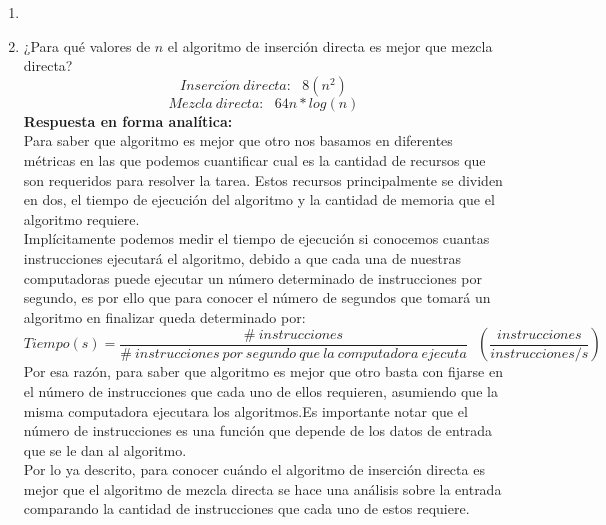 \documentclass[11pt]{article}
\begin{document}
\begin{enumerate}
 \item 
 
 
 
 
 
 
 
 
 \item ¿Para qué valores de $n$ el algoritmo de inserción directa es mejor 
 que mezcla directa? 
 \[
  Inserci\acute{o}n \ directa : \ \ \ 8(n^2)\]
  \[
  Mezcla\ directa: \ \ \ 64n*log(n)
 \]
 \textbf{Respuesta en forma analítica:} \\ 
  Para saber que algoritmo es mejor que otro nos basamos en diferentes 
  métricas en las que podemos cuantificar cual es la cantidad
  de recursos que son requeridos para resolver la tarea. Estos 
  recursos principalmente se dividen en dos, el tiempo de ejecución del
  algoritmo y la cantidad de memoria que el algoritmo requiere.\\
  Implícitamente podemos medir el tiempo de ejecución si conocemos 
  cuantas instrucciones ejecutará el algoritmo, debido  a que 
  cada una de nuestras computadoras puede ejecutar un número determinado
  de instrucciones por segundo, es por ello que para conocer el número
  de segundos que tomará un algoritmo en finalizar queda determinado 
  por:
  \[
   Tiempo (s) =\frac{\#\ instrucciones}{\#\ instrucciones\ por\ segundo\ que\ la\ computadora\ ejecuta}\ \ \ \left( \frac{instrucciones}{instrucciones/s} \right) 
  \]
   Por esa razón, para saber que algoritmo es mejor que otro 
  basta con fijarse en el número de instrucciones que cada
  uno de ellos requieren, asumiendo que la misma computadora ejecutara 
  los algoritmos.Es importante notar que   el número de instrucciones 
  es una función que depende de los datos de entrada que se le dan al 
  algoritmo. \\
  Por lo ya descrito, para conocer cuándo el algoritmo de 
  inserción directa es mejor que el algoritmo de mezcla directa se hace una análisis sobre 
  la entrada comparando la cantidad de instrucciones que cada
  uno de estos requiere.\\
  

\end{enumerate}
\end{document}
